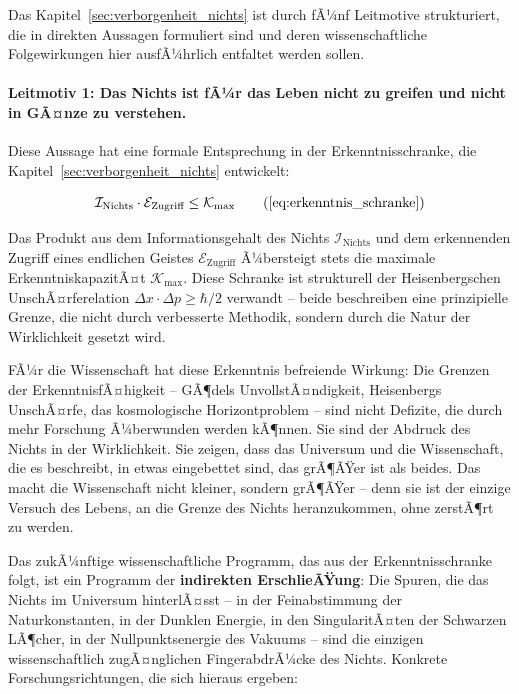 ﻿\documentclass[12pt,a4paper]{report}
\begin{document}
Das Kapitel~\ref{sec:verborgenheit_nichts} ist durch fÃ¼nf Leitmotive strukturiert, die in direkten Aussagen formuliert sind und deren wissenschaftliche Folgewirkungen hier ausfÃ¼hrlich entfaltet werden sollen.

\paragraph{Leitmotiv 1: Das Nichts ist fÃ¼r das Leben nicht zu greifen und nicht in GÃ¤nze zu verstehen.}

Diese Aussage hat eine formale Entsprechung in der Erkenntnisschranke, die Kapitel~\ref{sec:verborgenheit_nichts} entwickelt:

\begin{equation}
	\mathcal{I}_{\text{Nichts}} \cdot \mathcal{E}_{\text{Zugriff}} \leq \mathcal{K}_{\max}
	\tag{\ref{eq:erkenntnis_schranke}}
\end{equation}

Das Produkt aus dem Informationsgehalt des Nichts $\mathcal{I}_{\text{Nichts}}$ und dem erkennenden Zugriff eines endlichen Geistes $\mathcal{E}_{\text{Zugriff}}$ Ã¼bersteigt stets die maximale ErkenntniskapazitÃ¤t $\mathcal{K}_{\max}$. Diese Schranke ist strukturell der Heisenbergschen UnschÃ¤rferelation $\Delta x \cdot \Delta p \geq \hbar/2$ verwandt -- beide beschreiben eine prinzipielle Grenze, die nicht durch verbesserte Methodik, sondern durch die Natur der Wirklichkeit gesetzt wird.

FÃ¼r die Wissenschaft hat diese Erkenntnis befreiende Wirkung: Die Grenzen der ErkenntnisfÃ¤higkeit -- GÃ¶dels UnvollstÃ¤ndigkeit, Heisenbergs UnschÃ¤rfe, das kosmologische Horizontproblem -- sind nicht Defizite, die durch mehr Forschung Ã¼berwunden werden kÃ¶nnen. Sie sind der Abdruck des Nichts in der Wirklichkeit. Sie zeigen, dass das Universum und die Wissenschaft, die es beschreibt, in etwas eingebettet sind, das grÃ¶ÃŸer ist als beides. Das macht die Wissenschaft nicht kleiner, sondern grÃ¶ÃŸer -- denn sie ist der einzige Versuch des Lebens, an die Grenze des Nichts heranzukommen, ohne zerstÃ¶rt zu werden.

Das zukÃ¼nftige wissenschaftliche Programm, das aus der Erkenntnisschranke folgt, ist ein Programm der \textbf{indirekten ErschlieÃŸung}: Die Spuren, die das Nichts im Universum hinterlÃ¤sst -- in der Feinabstimmung der Naturkonstanten, in der Dunklen Energie, in den SingularitÃ¤ten der Schwarzen LÃ¶cher, in der Nullpunktsenergie des Vakuums -- sind die einzigen wissenschaftlich zugÃ¤nglichen FingerabdrÃ¼cke des Nichts. Konkrete Forschungsrichtungen, die sich hieraus ergeben:
\end{document}
